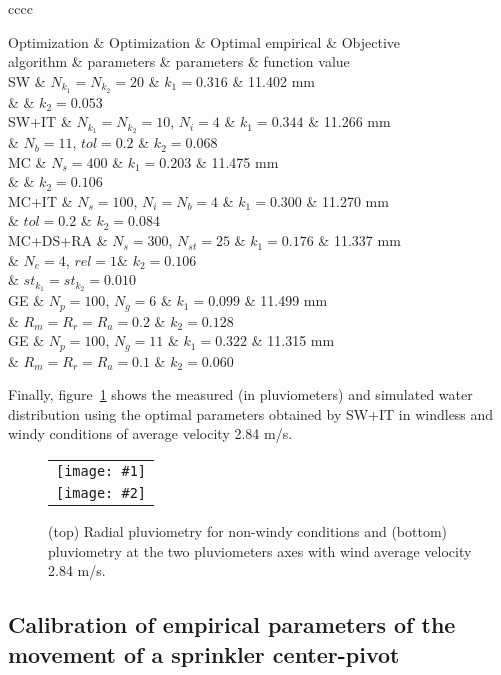 \documentclass[review,authoryear]{elsarticle}
\newcommand{\TABLE}[5]
{
	\begin{table}[ht!]
		\centering
		\caption{#4.\label{#5}}
		#1
		\tabulinesep=0.9mm
		\begin{tabu}{#2}
			#3
		\end{tabu}
	\end{table}
}
\newcommand{\FIGII}[4]
{
	\begin{figure}[ht!]
		\centering
		\begin{tabular}{c}
			\texttt{[image: \#1]} \\ \texttt{[image: \#2]}
		\end{tabular}
		\caption{#3.\label{#4}}
	\end{figure}
}
\begin{document}
\TABLE{\footnotesize}{cccc}
{
	Optimization & Optimization & Optimal empirical & Objective
	\\ algorithm & parameters & parameters & function value
	\\ \hline
	SW & $N_{k_1}=N_{k_2}=20$ & $k_1=0.316$ & 11.402 mm
	\\ & & $k_2=0.053$
	\\ \hline
	SW+IT & $N_{k_1}=N_{k_2}=10$, $N_i=4$ & $k_1=0.344$ & 11.266 mm
	\\ & $N_b=11$, $tol=0.2$ & $k_2=0.068$
	\\ \hline
	MC & $N_s=400$ & $k_1=0.203$ & 11.475 mm
	\\ & & $k_2=0.106$
	\\ \hline
	MC+IT & $N_s=100$, $N_i=N_b=4$ & $k_1=0.300$ & 11.270 mm
	\\ & $tol=0.2$ & $k_2=0.084$
	\\ \hline
	MC+DS+RA & $N_s=300$, $N_{st}=25$ & $k_1=0.176$ & 11.337 mm
	\\ & $N_e=4$, $rel=1$& $k_2=0.106$
	\\ & $st_{k_1}=st_{k_2}=0.010$
	\\ \hline
	GE & $N_p=100$, $N_g=6$ & $k_1=0.099$ & 11.499 mm
	\\ & $R_m=R_r=R_a=0.2$ & $k_2=0.128$
	\\ \hline
	GE & $N_p=100$, $N_g=11$ & $k_1=0.322$ & 11.315 mm
	\\ & $R_m=R_r=R_a=0.1$ & $k_2=0.060$
	\\ \hline
}{Optimal parameters and values of the evaluations function in the experiment of the sprinkler irrigation under windy conditions of 2.84 m/s using different optimization algorithms implemented in MPCOTool with the same total number of simulations ($N_{total}=400$)}{TabSprinklerII}

Finally, figure~\ref{FigSprinkler} shows the measured (in pluviometers) and simulated water distribution using the optimal parameters obtained by SW+IT in windless and windy conditions of average velocity 2.84 m/s.

\FIGII{sprinkler-0.eps}{sprinkler-2,84.eps}
{(top) Radial pluviometry for non-windy conditions and (bottom) pluviometry at
the two pluviometers axes with wind average velocity 2.84 m/s}{FigSprinkler}

\subsection{Calibration of empirical parameters of the movement of a
sprinkler center-pivot}
\end{document}
